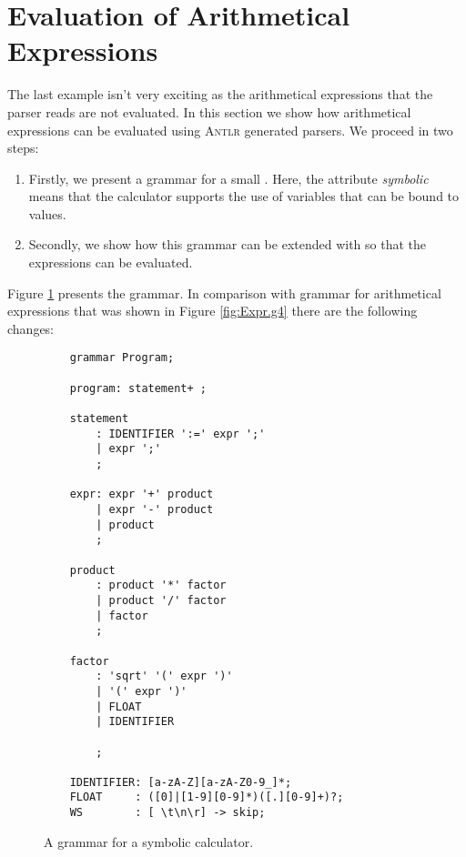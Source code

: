 \section{Evaluation of Arithmetical Expressions}
The last example isn't very exciting as the arithmetical expressions that the parser reads are not
evaluated.  In this section we show how arithmetical expressions can be evaluated using \textsc{Antlr}
generated parsers.  We proceed in two steps:
\begin{enumerate}
\item Firstly, we present a grammar for a small .  Here, the attribute
      \emph{symbolic} means that the calculator supports the use of variables that can be bound to values.
\item Secondly, we show how this grammar can be extended with  so that the expressions
      can be evaluated. 
\end{enumerate}
Figure \ref{fig:Program.g4} presents the grammar.  In comparison with grammar for arithmetical expressions that
was shown in Figure \ref{fig:Expr.g4} there are the following changes:

\begin{figure}[!ht]
\centering
\begin{verbatim}
    grammar Program;
    
    program: statement+ ; 
    
    statement
        : IDENTIFIER ':=' expr ';' 
        | expr ';'                 
        ;
    
    expr: expr '+' product 
        | expr '-' product 
        | product
        ;
    
    product 
        : product '*' factor 
        | product '/' factor 
        | factor
        ;
    
    factor
        : 'sqrt' '(' expr ')'
        | '(' expr ')'        
        | FLOAT               
        | IDENTIFIER          

        ;
    
    IDENTIFIER: [a-zA-Z][a-zA-Z0-9_]*;
    FLOAT     : ([0]|[1-9][0-9]*)([.][0-9]+)?;
    WS        : [ \t\n\r] -> skip; 
\end{verbatim}
\vspace*{-0.3cm}
\caption{A grammar for a symbolic calculator.}
\label{fig:Program.g4}
\end{figure}


